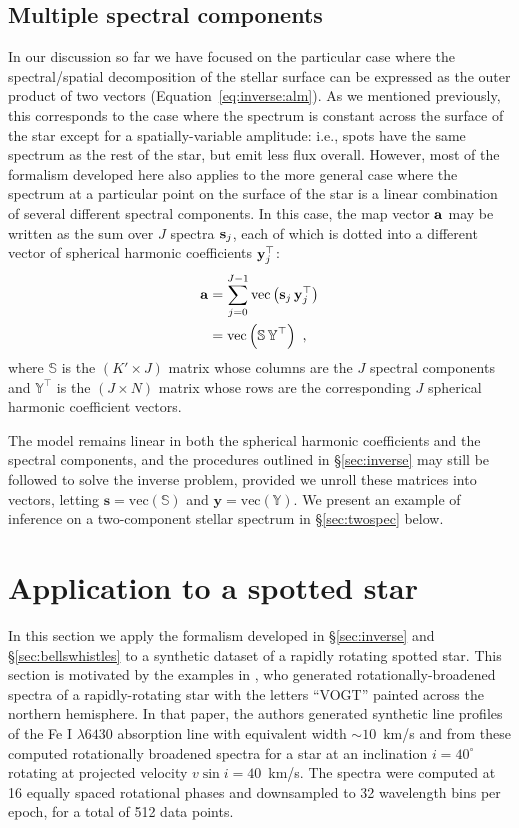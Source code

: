 \documentclass[modern]{aastex631}
\begin{document}
\subsection{Multiple spectral components}
\label{sec:eigen}
%
In our discussion so far we have focused on the particular case where the spectral/spatial decomposition of the stellar surface can be expressed as the outer product of two vectors (Equation~\ref{eq:inverse:alm}). 
As we mentioned previously, this corresponds to the case where the spectrum is constant across the surface of the star except for a spatially-variable amplitude: i.e., spots have the same spectrum as the rest of the star, but emit less flux overall. 
However, most of the formalism developed here also applies to the more general case where the spectrum at a particular point on the surface of the star is a linear combination of several different spectral components. 
In this case, the map vector ${\mathbf{a}}$ may be written as the sum over $J$ spectra ${\mathbf{s}}_j$, each of which is dotted into a different vector of spherical harmonic coefficients ${\mathbf{y}}_j^\top$:
%
\begin{align}
    \label{eq:eigen:alm}
    {\ensuremath{\mathbf{a}}}
     & =
    \sum_{j=0}^{J-1}\mathrm{vec}\left( {\mathbf{s}}_j \, {\mathbf{y}}_j^\top \right) \\
     & =
    \mathrm{vec}\left( \boldsymbol{\mathbb{S}} \, \boldsymbol{\mathbb{Y}}^\top \right) \hskip 0.33em,
\end{align}
%
where $\boldsymbol{\mathbb{S}}$ is the $(K' \times J)$ matrix whose columns are the $J$ spectral components and $\boldsymbol{\mathbb{Y}}^\top$ is the $(J \times N)$ matrix whose rows are the corresponding $J$ spherical harmonic coefficient vectors.

The model remains linear in both the spherical harmonic coefficients and the spectral components, and the procedures outlined in \S\ref{sec:inverse} may still be followed to solve the inverse problem, provided we unroll these matrices into vectors, letting $\mathbf{s} = \mathrm{vec}(\boldsymbol{\mathbb{S}})$ and $\mathbf{y} = \mathrm{vec}(\boldsymbol{\mathbb{Y}})$.
We present an example of inference on a two-component stellar spectrum in \S\ref{sec:twospec}
below.

\section{Application to a spotted star}
\label{sec:spotstar}

In this section we apply the formalism developed in \S\ref{sec:inverse} and \S\ref{sec:bellswhistles} to a synthetic dataset of a rapidly rotating spotted star. 
This section is motivated by the examples in \cite{Vogt1987}, who generated rotationally-broadened spectra of a rapidly-rotating star with the letters ``VOGT'' painted across the northern hemisphere. 
In that paper, the authors generated synthetic line profiles of the Fe I $\lambda 6430$ absorption line with equivalent width ${\sim}10$~km/s and from these computed rotationally broadened spectra for a star at an inclination $i=40^\circ$ rotating at projected velocity $v\sin i = 40$~km/s.
The spectra were computed at 16 equally spaced rotational phases and downsampled to 32 wavelength bins per epoch, for a total of 512 data points.
\end{document}
